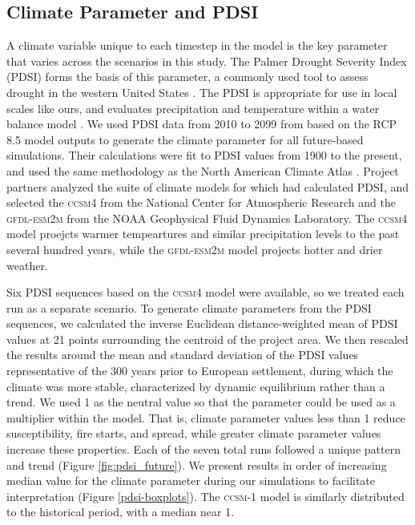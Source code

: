\subsection{Climate Parameter and PDSI}
A climate variable unique to each timestep in the model is the key parameter that varies across the scenarios in this study. The Palmer Drought Severity Index (PDSI) forms the basis of this parameter, a commonly used tool to assess drought in the western United States \citep{Cook2004}. The PDSI is appropriate for use in local scales like ours, and evaluates precipitation and temperature within a water balance model \citep{HeimJr2002}. We used PDSI data from 2010 to 2099 from \citet{Cook2014} based on the RCP 8.5 model outputs to generate the climate parameter for all future-based simulations. Their calculations were fit to PDSI values from 1900 to the present, and used the same methodology as the North American Climate Atlas \citep{Cook2004}. Project partners analyzed the suite of climate models for which \citet{Cook2014} had calculated PDSI, and selected the \textsc{ccsm4} from the National Center for Atmospheric Research and the \textsc{gfdl-esm2m} from the NOAA Geophysical Fluid Dynamics Laboratory. The \textsc{ccsm4} model proejcts warmer tempeartures and similar precipitation levels to the past several hundred years, while the \textsc{gfdl-esm2m} model projects hotter and drier weather.

Six PDSI sequences based on the \textsc{ccsm4} model were available, so we treated each run as a separate scenario. To generate climate parameters from the PDSI sequences, we calculated the inverse Euclidean distance-weighted mean of PDSI values at 21 points surrounding the centroid of the project area. We then rescaled the results around the mean and standard deviation of the PDSI values representative of the 300 years prior to European settlement, during which the climate was more stable, characterized by dynamic equilibrium rather than a trend. We used 1 as the neutral value so that the parameter could be used as a multiplier within the model. That is, climate parameter values less than 1 reduce susceptibility, fire starts, and spread, while greater climate parameter values increase these properties. Each of the seven total runs followed a unique pattern and trend (Figure \ref{fig:pdsi_future}). We present results in order of increasing median value for the climate parameter during our simulations to facilitate interpretation (Figure \ref{pdsi-boxplots}). The \textsc{ccsm-1} model is similarly distributed to the historical period, with a median near 1.


